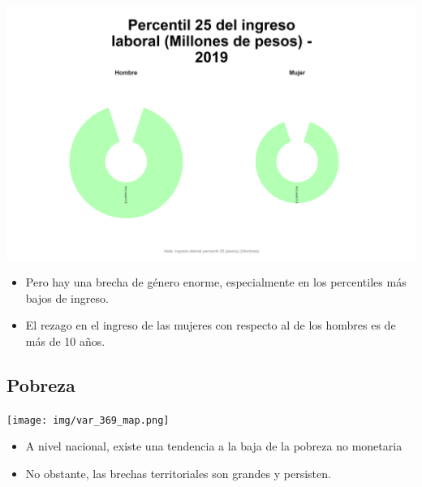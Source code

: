 \documentclass[aspectratio=169]{beamer}
\begin{document}
    \begin{slide}{3} 
                      \begin{imagecolumn}
                \includegraphics[width=\columnwidth]{img/var_4_static.png}
            \end{imagecolumn}
            \begin{textcolumn}
                \begin{itemize}
                    \item Pero hay una brecha de género enorme, especialmente en los percentiles más bajos de ingreso.
                    \item El rezago en el ingreso de las mujeres con respecto al de los hombres es de más de 10 años.
                \end{itemize}
            \end{textcolumn}

    \printcolumns
    \end{slide}

    
    \subsection{Pobreza}
    
    \begin{slide}{4} 
                      \begin{imagecolumn}
                \texttt{[image: img/var\_369\_map.png]}
            \end{imagecolumn}
            \begin{textcolumn}
                \begin{itemize}
                    \item A nivel nacional, existe una tendencia a la baja de la pobreza no monetaria
                    \item No obstante, las brechas territoriales son grandes y persisten.
                \end{itemize}
            \end{textcolumn}

    \printcolumns
    \end{slide}
     
\end{document}
